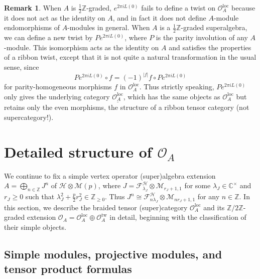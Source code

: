 \documentclass[11pt, reqno]{amsart}
\theoremstyle{definition}\newtheorem{defi}[thm]{Definition}
\theoremstyle{definition}\newtheorem{rem}[thm]{Remark}
\theoremstyle{definition}\newtheorem{exam}[thm]{Example}
\theoremstyle{definition}\newtheorem{assum}[thm]{Assumption}
\newcommand{\cH}{\mathcal{H}}
\newcommand{\cM}{\mathcal{M}}
\newcommand{\cF}{\mathcal{F}}
\newcommand{\cO}{\mathcal{O}}
\newcommand{\CC}{\mathbb{C}}
\newcommand{\ZZ}{\mathbb{Z}}
\newcommand{\Oloc}{\cO^{\mathrm{loc}}}
\newcommand{\Otw}{\cO^{\mathrm{tw}}}
\begin{document}
\begin{rem}
When $A$ is $\frac{1}{2}\ZZ$-graded, $e^{2\pi i L(0)}$ fails to define a twist on $\Oloc_A$ because it does not act as the identity on $A$, and in fact it does not define $A$-module endomorphisms of $A$-modules in general. When $A$ is a $\frac{1}{2}\ZZ$-graded superalgebra, we can define a new twist by $P e^{2\pi i L(0)}$, where $P$ is the parity involution of any $A$-module. This isomorphism acts as the identity on $A$ and satisfies the properties of a ribbon twist, except that it is not quite a natural transformation in the usual sense, since
\begin{equation*}
P e^{2\pi i L(0)}\circ f =(-1)^{\vert f\vert}f\circ P e^{2\pi i L(0)}
\end{equation*}
for parity-homogeneous morphisms $f$ in $\Oloc_A$. Thus strictly speaking, $Pe^{2\pi i L(0)}$ only gives the underlying category $\underline{\Oloc_A}$, which has the same objects as $\Oloc_A$ but retains only the even morphisms, the structure of a ribbon tensor category (not supercategory!).
\end{rem}




\section{Detailed structure of \texorpdfstring{$\cO_A$}{OA}}\label{sec:detailed_structure}

We continue to fix a simple vertex operator (super)algebra extension $A=\bigoplus_{n\in\ZZ} J^n$ of $\cH\otimes\cM(p)$, where $J=\cF^\cH_{\lambda_J}\otimes\cM_{r_J+1,1}$ for some $\lambda_J\in\CC^\times$ and $r_J\geq 0$ such that $\lambda_J^2+\frac{p}{2}r_J^2\in\ZZ_{\geq 0}$. Thus $J^n\cong \cF^\cH_{n\lambda_J}\otimes\cM_{nr_J+1,1}$ for any $n\in\ZZ$. In this section, we describe the braided tensor (super)category $\Oloc_A$ and its $\ZZ/2\ZZ$-graded extension $\cO_A=\Oloc_A\oplus\Otw_A$  in detail, beginning with the classification of their simple objects.

\subsection{Simple modules, projective modules, and tensor product formulas}
\end{document}
